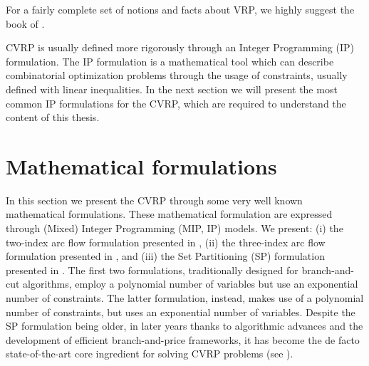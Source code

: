 For a fairly complete set of notions and facts about VRP, we highly suggest
the book  of \textcite{toth2014}.


CVRP is usually defined more rigorously through an Integer Programming (IP) formulation.
The IP formulation is a mathematical tool which can describe combinatorial optimization problems
through the usage of constraints, usually defined with linear inequalities.
In the next section we will present the most common IP formulations for the CVRP, which
are required to understand the content of this thesis.


\begin{comment}
\cite{toth2002}
The distribution of goods concerns the service, in a given time period, of a set of
customers by a set of vehicles, which are located in one or more depots, are operated by a
set of crews (drivers), and perform their movements by using an appropriate road network. In
particular, the solution of a VRP calls for the determination of a set of routes, each performed
by a single vehicle that starts and ends at its own depot, such that all the requirements
of the customers are fulfilled, all the operational constraints are satisfied, and the global
transportation cost is minimized. In this section, we describe the typical characteristics of
the routing and scheduling problems by considering their main components (road network,
customers, depots, vehicles, and drivers), the different operational constraints that can be
imposed on the construction of the routes, and the possible objectives to be achieved in the
optimization process.
The road network, used for the transportation of goods, is generally described through
a graph, whose arcs represent the road sections and whose vertices correspond to the road
junctions and to the depot and customer locations.
\end{comment}

\section{Mathematical formulations}
\label{sec:intro-cvrp-mathematical-formulations}

In this section we present the CVRP through some very well known mathematical formulations.
These mathematical formulation are expressed through (Mixed) Integer Programming (MIP, IP)
models.
We present:
(i) the two-index arc flow formulation presented in \textcite{laporte1983, laporte1985, laporte1986},
(ii) the three-index arc flow formulation presented in \textcite{toth2002},
and (iii) the Set Partitioning (SP) formulation presented in \textcite{balinski1964}.
The first two formulations, traditionally designed
for branch-and-cut algorithms, employ a polynomial number of variables
but use an exponential number of constraints.
The latter formulation, instead, makes use of a polynomial number of constraints,
but uses an exponential number of variables.
Despite the SP formulation being older, in later years thanks to algorithmic advances
and the development of efficient branch-and-price frameworks, it has become the de facto
state-of-the-art core ingredient for solving CVRP problems (see \cite{pessoa2020}).

